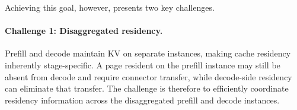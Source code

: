%
%
%

Achieving this goal, however, presents two key challenges.

\paragraph{Challenge 1: Disaggregated residency.}
Prefill and decode maintain KV on separate instances, making cache residency inherently stage-specific.
A page resident on the prefill instance may still be absent from decode and require connector transfer, while decode-side residency can eliminate that transfer.
The challenge is therefore to efficiently coordinate residency information across the disaggregated prefill and decode instances.

